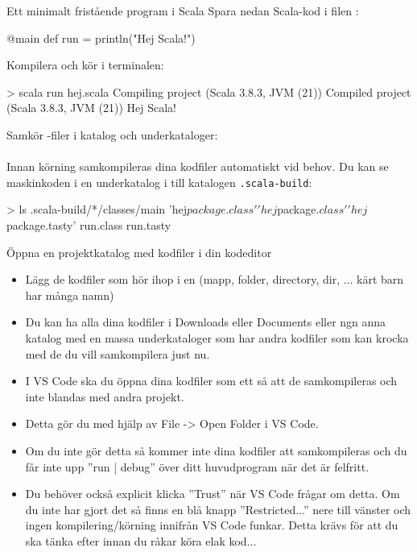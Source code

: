 \begin{Slide}{Ett minimalt fristående program i Scala}\SlideFontSmall
Spara nedan Scala-kod i filen :
\begin{Code}
@main def run = println("Hej Scala!")
\end{Code}

Kompilera och kör i terminalen:
\begin{REPL}
> scala run hej.scala 
Compiling project (Scala 3.8.3, JVM (21))
Compiled project (Scala 3.8.3, JVM (21))
Hej Scala! 
\end{REPL}
Samkör  -filer i  katalog och  underkataloger:\\ \\\vspace{1em} 
Innan körning samkompileras dina kodfiler automatiskt vid behov. Du kan se maskinkoden i en underkatalog i till katalogen \texttt{.scala-build}: 
\begin{REPL}
> ls .scala-build/*/classes/main
'hej$package.class'  'hej$package$.class'  'hej$package.tasty'   run.class   run.tasty
\end{REPL}
\end{Slide}

\ifkompendium\else
\begin{SlideExtra}{Öppna en projektkatalog med kodfiler i din kodeditor}
  \begin{itemize} \SlideFontSmall
    \item Lägg de kodfiler som hör ihop i en   (mapp, folder, directory, dir, ... kärt barn har många namn)
    \item Du kan  ha alla dina kodfiler i Downloads eller Documents eller ngn anna katalog med en massa underkataloger som har andra kodfiler som kan krocka med de du vill samkompilera just nu.
    \item I VS Code ska du öppna dina kodfiler som ett   så att de samkompileras och inte blandas med andra projekt.
    \item Detta gör du med hjälp av File -> Open Folder i VS Code.
    \item Om du inte gör detta så kommer inte dina kodfiler att samkompileras och du får inte upp ''run | debug'' över ditt huvudprogram när det är felfritt.
    \item Du behöver också explicit klicka ''Trust'' när VS Code frågar om detta. Om du inte har gjort det så finns en blå knapp ''Restricted...'' nere till vänster och ingen kompilering/körning innifrån VS Code funkar. Detta krävs för att du ska tänka efter innan du råkar köra elak kod... 
  \end{itemize}
\end{SlideExtra}
\fi

